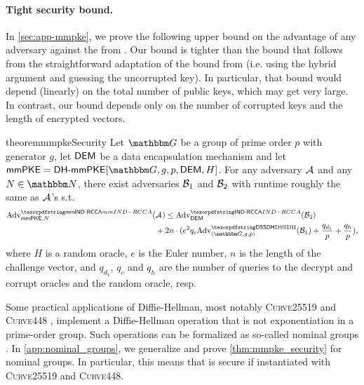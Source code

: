 \paragraph{Tight security bound.}
In \cref{sec:app-mmpke}, we prove the following upper bound on the advantage of any adversary against the \mmPKE from \cite{ASIACCS:PinPoeSch14}. Our bound is tighter than the bound that follows from the straightforward adaptation of the bound from \cite{ASIACCS:PinPoeSch14} (i.e. using the hybrid argument and guessing the uncorrupted key). In particular, that bound would depend (linearly) on the total number of public keys, which may get very large. In contrast, our bound depends only on the number of corrupted keys and the length of encrypted vectors.

\begin{restatable}{theorem}{mmpkeSecurity}\label{thm:mmpke_security}
  Let $\Grp$ be a group of prime order $p$ with generator $g$, let $\dem$ be a data encapsulation mechanism and let
  $\mmPKE = \dhmmpke[\Grp, g, p, \dem, H]$. For any adversary $\Adv$ and any $N \in \N$, there exist adversaries $\Bdv[1]$ and $\Bdv[2]$ with runtime roughly the same as $\Adv$'s s.t.
  \begin{align*}
    \textnormal{Adv}^{\mmindrcca}_{\mmPKE, N}(& \Adv) \leq \adv{\indrcca}{\dem}({\Bdv[2]}) \\
                                              &+2n\cdot(e^2q_c \adv{\sdh}{(\Grp, g, p)}({\Bdv[1]}) + \frac{q_{d_1}}{p} + \frac{q_{h}}{p}),
  \end{align*}
  where $H$ is a random oracle, $e$
  is the Euler number, $n$ is the length of the challenge vector, and $q_{d_1}$, $q_c$ and $q_h$ are the number of queries to the decrypt and corrupt oracles and the random oracle, resp.
\end{restatable}

\begin{remark}
Some practical applications of Diffie-Hellman, most notably \textsc{Curve25519} and \textsc{Curve448} \cite{rfc7748}, implement a Diffie-Hellman operation that is not exponentiation in a prime-order group. Such operations can be formalized as so-called nominal groups \cite{EC:ABHKLR21_2}. In \cref{app:nominal_groups}, we generalize and prove \cref{thm:mmpke_security} for nominal groups. In particular, this means that \dhmmpke is secure if instantiated with \textsc{Curve25519} and \textsc{Curve448}.
\end{remark}


